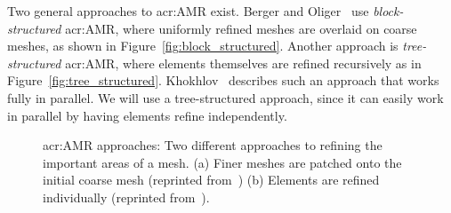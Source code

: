 Two general approaches to \acrshort{acr:AMR} exist. Berger and Oliger~\cite{Berger1984} use
\textit{block-structured} \acrshort{acr:AMR}, where uniformly refined meshes are overlaid on coarse
meshes, as shown in Figure~\ref{fig:block_structured}. Another approach is \textit{tree-structured}
\acrshort{acr:AMR}, where elements themselves are refined recursively as in
Figure~\ref{fig:tree_structured}. Khokhlov~\cite{Khokhlov1998} describes such an approach that works
fully in parallel. We will use a tree-structured approach, since it can easily work in parallel by
having elements refine independently.

\begin{figure}[H]
    \centering
    \hfill
    \caption{\Acrlong{acr:AMR} approaches: Two different approaches to refining the important areas of a mesh. (a) Finer meshes are patched onto the initial coarse mesh (reprinted from~\cite{Berger1984}) (b) Elements are refined individually (reprinted from~\cite{Khokhlov1998}).}\label{fig:amr_structures}
\end{figure}

